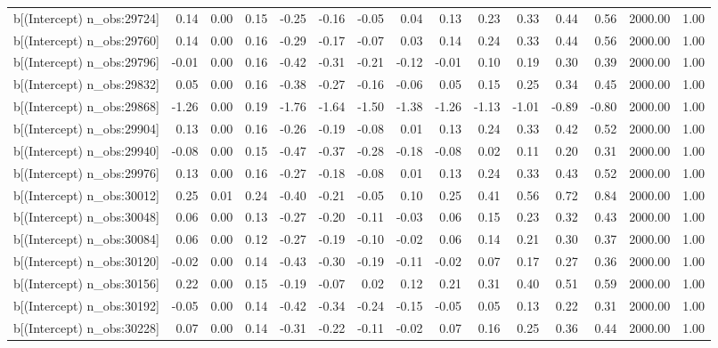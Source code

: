 \begin{table}[ht]
\begin{tabular}{rrrrrrrrrrrrrrr}
  b[(Intercept) n\_obs:29724] & 0.14 & 0.00 & 0.15 & -0.25 & -0.16 & -0.05 & 0.04 & 0.13 & 0.23 & 0.33 & 0.44 & 0.56 & 2000.00 & 1.00 \\ 
  b[(Intercept) n\_obs:29760] & 0.14 & 0.00 & 0.16 & -0.29 & -0.17 & -0.07 & 0.03 & 0.14 & 0.24 & 0.33 & 0.44 & 0.56 & 2000.00 & 1.00 \\ 
  b[(Intercept) n\_obs:29796] & -0.01 & 0.00 & 0.16 & -0.42 & -0.31 & -0.21 & -0.12 & -0.01 & 0.10 & 0.19 & 0.30 & 0.39 & 2000.00 & 1.00 \\ 
  b[(Intercept) n\_obs:29832] & 0.05 & 0.00 & 0.16 & -0.38 & -0.27 & -0.16 & -0.06 & 0.05 & 0.15 & 0.25 & 0.34 & 0.45 & 2000.00 & 1.00 \\ 
  b[(Intercept) n\_obs:29868] & -1.26 & 0.00 & 0.19 & -1.76 & -1.64 & -1.50 & -1.38 & -1.26 & -1.13 & -1.01 & -0.89 & -0.80 & 2000.00 & 1.00 \\ 
  b[(Intercept) n\_obs:29904] & 0.13 & 0.00 & 0.16 & -0.26 & -0.19 & -0.08 & 0.01 & 0.13 & 0.24 & 0.33 & 0.42 & 0.52 & 2000.00 & 1.00 \\ 
  b[(Intercept) n\_obs:29940] & -0.08 & 0.00 & 0.15 & -0.47 & -0.37 & -0.28 & -0.18 & -0.08 & 0.02 & 0.11 & 0.20 & 0.31 & 2000.00 & 1.00 \\ 
  b[(Intercept) n\_obs:29976] & 0.13 & 0.00 & 0.16 & -0.27 & -0.18 & -0.08 & 0.01 & 0.13 & 0.24 & 0.33 & 0.43 & 0.52 & 2000.00 & 1.00 \\ 
  b[(Intercept) n\_obs:30012] & 0.25 & 0.01 & 0.24 & -0.40 & -0.21 & -0.05 & 0.10 & 0.25 & 0.41 & 0.56 & 0.72 & 0.84 & 2000.00 & 1.00 \\ 
  b[(Intercept) n\_obs:30048] & 0.06 & 0.00 & 0.13 & -0.27 & -0.20 & -0.11 & -0.03 & 0.06 & 0.15 & 0.23 & 0.32 & 0.43 & 2000.00 & 1.00 \\ 
  b[(Intercept) n\_obs:30084] & 0.06 & 0.00 & 0.12 & -0.27 & -0.19 & -0.10 & -0.02 & 0.06 & 0.14 & 0.21 & 0.30 & 0.37 & 2000.00 & 1.00 \\ 
  b[(Intercept) n\_obs:30120] & -0.02 & 0.00 & 0.14 & -0.43 & -0.30 & -0.19 & -0.11 & -0.02 & 0.07 & 0.17 & 0.27 & 0.36 & 2000.00 & 1.00 \\ 
  b[(Intercept) n\_obs:30156] & 0.22 & 0.00 & 0.15 & -0.19 & -0.07 & 0.02 & 0.12 & 0.21 & 0.31 & 0.40 & 0.51 & 0.59 & 2000.00 & 1.00 \\ 
  b[(Intercept) n\_obs:30192] & -0.05 & 0.00 & 0.14 & -0.42 & -0.34 & -0.24 & -0.15 & -0.05 & 0.05 & 0.13 & 0.22 & 0.31 & 2000.00 & 1.00 \\ 
  b[(Intercept) n\_obs:30228] & 0.07 & 0.00 & 0.14 & -0.31 & -0.22 & -0.11 & -0.02 & 0.07 & 0.16 & 0.25 & 0.36 & 0.44 & 2000.00 & 1.00 \\ 

\end{tabular}
\end{table}
